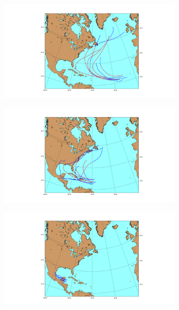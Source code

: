\begin{figure}
	\centering
	\begin{subfigure}[t]{0.45\textwidth}
		\centering
		\includegraphics[width=\linewidth, trim=350 50 300 50, clip]{images/similar_hurricanes_1.png}
	\end{subfigure}
	\begin{subfigure}[t]{0.45\textwidth}
		\centering
		\includegraphics[width=\linewidth, trim=350 50 300 50, clip]{images/similar_hurricanes_5.png}
	\end{subfigure}
	\break
	\begin{subfigure}[t]{0.45\textwidth}
		\centering
		\includegraphics[width=\linewidth, trim=350 50 300 50, clip]{images/similar_hurricanes_3.png}

\end{subfigure}
\end{figure}
